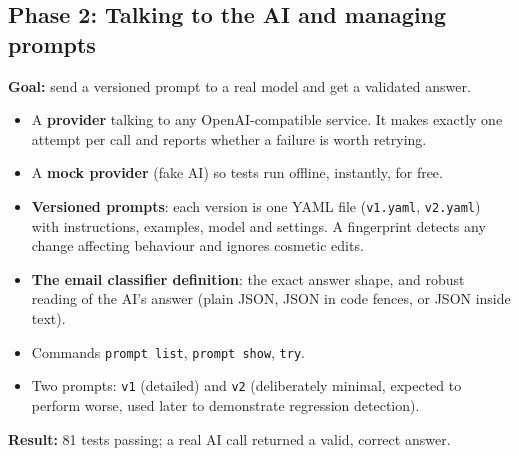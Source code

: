 \documentclass[11pt,a4paper]{article}
\newcommand{\code}[1]{\nolinkurl{#1}}
\begin{document}
\subsection{Phase 2: Talking to the AI and managing prompts}
\textbf{Goal:} send a versioned prompt to a real model and get a validated answer.
\begin{itemize}
  \item A \textbf{provider} talking to any OpenAI-compatible service. It makes exactly one
        attempt per call and reports whether a failure is worth retrying.
  \item A \textbf{mock provider} (fake AI) so tests run offline, instantly, for free.
  \item \textbf{Versioned prompts}: each version is one YAML file (\code{v1.yaml},
        \code{v2.yaml}) with instructions, examples, model and settings. A fingerprint detects
        any change affecting behaviour and ignores cosmetic edits.
  \item \textbf{The email classifier definition}: the exact answer shape, and robust reading of
        the AI's answer (plain JSON, JSON in code fences, or JSON inside text).
  \item Commands \texttt{prompt list}, \texttt{prompt show}, \code{try}.
  \item Two prompts: \code{v1} (detailed) and \code{v2} (deliberately minimal, expected to
        perform worse, used later to demonstrate regression detection).
\end{itemize}
\textbf{Result:} 81 tests passing; a real AI call returned a valid, correct answer.
\end{document}

